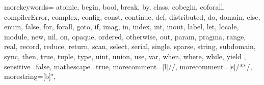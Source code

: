   {
    morekeywords={
      atomic,
      begin, bool, break, by,
      class, cobegin, coforall, compilerError, complex, config, const, continue,
      def, distributed, do, domain,
      else, enum,
      false, for, forall,
      goto,
      if, imag, in, index, int, inout,
      label, let, locale,
      module,
      new, nil,
      on, opaque, ordered, otherwise, out,
      param, pragma,
      range, real, record, reduce, return,
      scan, select, serial, single, sparse, string, subdomain, sync,
      then, true, tuple, type,
      uint, union, use,
      var,
      when, where, while,
      yield
    },
    sensitive=false,
    mathescape=true,
    morecomment=[l]{//},
    morecomment=[s]{/*}{*/},
    morestring=[b]",
}


\newcommand{\chpl}[1]{\lstinline[language=chapel,basicstyle=\small\ttfamily,keywordstyle=]!#1!}
\newcommand{\varname}[1]{\emph{#1}}
\newcommand{\typename}[1]{\emph{#1}}
\newcommand{\fnname}[1]{\chpl{#1}}






\newenvironment{protobody}{\begin{description}\item[\quad\quad] }{\end{description}}
